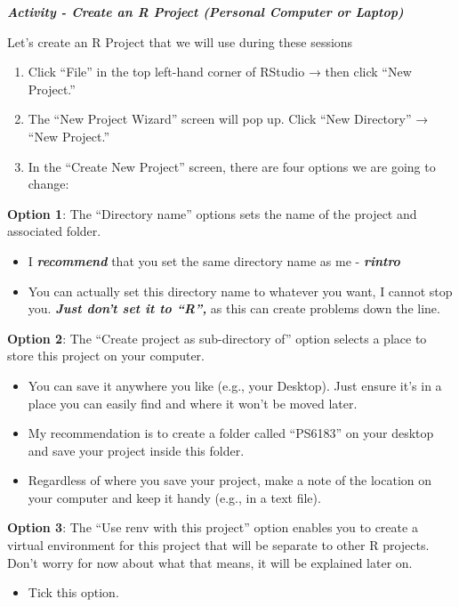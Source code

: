 \documentclass[
]{book}
\providecommand{\tightlist}{%
  \setlength{\itemsep}{0pt}\setlength{\parskip}{0pt}}
\begin{document}
\textbf{\emph{Activity - Create an R Project (Personal Computer or Laptop)}}

Let's create an R Project that we will use during these sessions

\begin{enumerate}
\def\labelenumi{\arabic{enumi}.}
\item
  Click ``File'' in the top left-hand corner of RStudio → then click ``New Project.''
\item
  The ``New Project Wizard'' screen will pop up. Click ``New Directory'' → ``New Project.''
\item
  In the ``Create New Project'' screen, there are four options we are going to change:
\end{enumerate}

\textbf{Option 1}: The ``Directory name'' options sets the name of the project and associated folder.

\begin{itemize}
\item
  I \textbf{\emph{recommend}} that you set the same directory name as me - \textbf{\emph{rintro}}
\item
  You can actually set this directory name to whatever you want, I cannot stop you. \textbf{\emph{Just don't set it to ``R'',}} as this can create problems down the line.
\end{itemize}

\textbf{Option 2}: The ``Create project as sub-directory of'' option selects a place to store this project on your computer.

\begin{itemize}
\item
  You can save it anywhere you like (e.g., your Desktop). Just ensure it's in a place you can easily find and where it won't be moved later.
\item
  My recommendation is to create a folder called ``PS6183'' on your desktop and save your project inside this folder.
\item
  Regardless of where you save your project, make a note of the location on your computer and keep it handy (e.g., in a text file).
\end{itemize}

\textbf{Option 3}: The ``Use renv with this project'' option enables you to create a virtual environment for this project that will be separate to other R projects. Don't worry for now about what that means, it will be explained later on.

\begin{itemize}
\tightlist
\item
  Tick this option.
\end{itemize}
\end{document}
